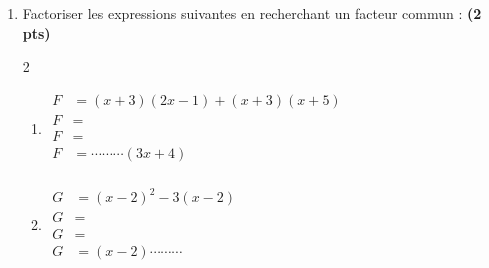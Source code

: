 \documentclass[12pt,a4paper]{article}
\begin{document}
\begin{enumerate}
    \item Factoriser les expressions suivantes en recherchant un facteur commun : \textbf{(2 pts)}

\begin{multicols}{2}
\setlength{\columnseprule}{0.1mm}
\begin{enumerate}
\item[]
\(
\begin{aligned}
F&=(x + 3)(2x - 1) + (x + 3)(x + 5)\\[0.5cm]
F&=\\[0.5cm]
F&=\\[0.5cm]
F&=\cdots\cdots\cdots(3x + 4)\\
\end{aligned}
\)
\item[]
\(
\begin{aligned}
G&=(x - 2)^2 - 3(x - 2)\\[0.5cm]
G&=\\[0.5cm]
G&=\\[0.5cm]
G&=(x - 2)\cdots\cdots\cdots\\
\end{aligned}
\)
\end{enumerate}
\end{multicols}     
    
\end{enumerate}
\newpage
\end{document}
